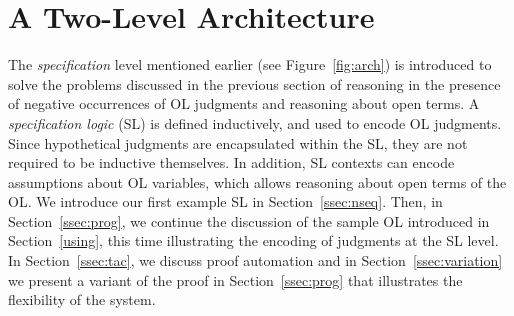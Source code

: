 \documentclass[final]{svjour3}
\begin{document}
\section{A Two-Level Architecture}
\label{sec:2lev}




The \emph{specification} level mentioned earlier (see
Figure~\ref{fig:arch}) is introduced to solve the problems discussed
in the previous section of reasoning in the presence of negative
occurrences of OL judgments and reasoning about open terms.  A
\emph{specification logic} (SL) is defined inductively, and used to
encode OL judgments.  Since hypothetical judgments are encapsulated
within the SL, they are not required to be inductive themselves.  In
addition, SL contexts can encode assumptions about OL variables, which
allows reasoning about open terms of the OL\@.  We introduce our first
example SL in Section~\ref{ssec:nseq}.  Then, in
Section~\ref{ssec:prog}, we continue the discussion of the sample OL
introduced in Section~\ref{using}, this time illustrating the encoding
of judgments at the SL level.
In Section~\ref{ssec:tac}, we discuss proof automation and in
Section~\ref{ssec:variation}
we present a variant of the proof in Section~\ref{ssec:prog} that
illustrates the flexibility of the system.
\end{document}
